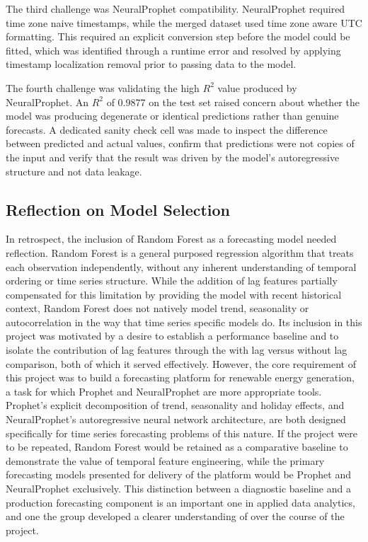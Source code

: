 \documentclass[conference]{IEEEtran}
\begin{document}
The third challenge was NeuralProphet compatibility. NeuralProphet required time zone naive timestamps, while the merged dataset used time zone aware UTC formatting. This required an explicit conversion step before the model could be fitted, which was identified through a runtime error and resolved by applying timestamp localization removal prior to passing data to the model.
 
The fourth challenge was validating the high \(R^2\) value produced by NeuralProphet. An \(R^2\) of 0.9877 on the test set raised concern about whether the model was producing degenerate or identical predictions rather than genuine forecasts. A dedicated sanity check cell was made to inspect the difference between predicted and actual values, confirm that predictions were not copies of the input and verify that the result was driven by the model's autoregressive structure and not data leakage.
 
\subsection{Reflection on Model Selection}
 
In retrospect, the inclusion of Random Forest as a forecasting model needed reflection. Random Forest is a general purposed regression algorithm that treats each observation independently, without any inherent understanding of temporal ordering or time series structure. While the addition of lag features partially compensated for this limitation by providing the model with recent historical context, Random Forest does not natively model trend, seasonality or autocorrelation in the way that time series specific models do. Its inclusion in this project was motivated by a desire to establish a performance baseline and to isolate the contribution of lag features through the with lag versus without lag comparison, both of which it served effectively. However, the core requirement of this project was to build a forecasting platform for renewable energy generation, a task for which Prophet and NeuralProphet are more appropriate tools. Prophet's explicit decomposition of trend, seasonality and holiday effects, and NeuralProphet's autoregressive neural network architecture, are both designed specifically for time series forecasting problems of this nature. If the project were to be repeated, Random Forest would be retained as a comparative baseline to demonstrate the value of temporal feature engineering, while the primary forecasting models presented for delivery of the platform would be Prophet and NeuralProphet exclusively. This distinction between a diagnostic baseline and a production forecasting component is an important one in applied data analytics, and one the group developed a clearer understanding of over the course of the project.
 
\end{document}
